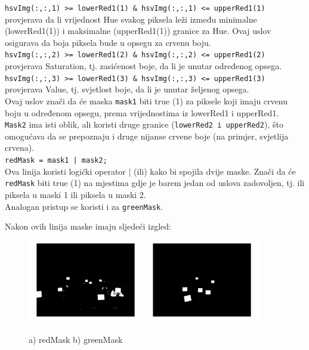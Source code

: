 \documentclass[a4paper,12pt]{article}
\begin{document}




\noindent \texttt{hsvImg(:,:,1) >= lowerRed1(1) \& hsvImg(:,:,1) <= upperRed1(1)} provjerava da li vrijednost Hue svakog piksela leži između minimalne (lowerRed1(1)) i maksimalne (upperRed1(1)) granice za Hue. 
Ovaj uslov osigurava da boja piksela bude u opsegu za crvenu boju.\\

 \texttt{hsvImg(:,:,2) >= lowerRed1(2) \& hsvImg(:,:,2) <= upperRed1(2)} provjerava Saturation, tj. zasićenost boje, da li je unutar određenog opsega.\\

\texttt{hsvImg(:,:,3) >= lowerRed1(3) \& hsvImg(:,:,3) <= upperRed1(3)} provjerava Value, tj. svjetlost boje, da li je unutar željenog opsega. \\

Ovaj uslov znači da će maska \texttt{mask1} biti true (1) za piksele koji imaju crvenu boju u određenom opsegu, prema vrijednostima iz lowerRed1 i upperRed1.\\

\texttt{Mask2} ima isti oblik, ali koristi druge granice (\texttt{lowerRed2 i upperRed2}), što omogućava da se prepoznaju i druge nijanse crvene boje (na primjer, svjetlija crvena).\\

\texttt{redMask = mask1 | mask2;}\\

Ova linija koristi logički operator | (ili) kako bi spojila dvije maske. Znači da će \texttt{redMask} biti true (1) na mjestima gdje je barem jedan od uslova zadovoljen, tj. ili piksela u maski 1 ili piksela u maski 2. \\

\noindent Analogan pristup se koristi i za \texttt{greenMask}.

Nakon ovih linija maske imaju sljedeći izgled:
\begin{figure}[htbp]
    \centering
    \includegraphics[width=0.45\textwidth]{redmask.jpg}
    \hfill
    \includegraphics[width=0.45\textwidth]{greenmask.jpg} 
    \caption{a) redMask b) greenMask}
    \label{fig:redMaskgreenMask}
\end{figure}
\end{document}
